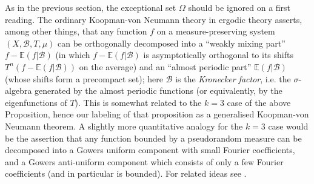 \documentclass[12pt,a4paper,reqno]{amsart}
\numberwithin{equation}{section}
\theoremstyle{plain}
\theoremstyle{definition}
\def\B{{\mathcal B}}
\def\E{{\mathbb E}}
\def\vs{\vspace{11pt}}
\def\ni{\noindent}
\def\emph#1{{\it #1}}
\begin{document}
\ni\emph{Remarks.}  As in the previous section, the exceptional set $\Omega$ should be ignored on a first reading. The ordinary Koopman-von Neumann theory in ergodic theory asserts, among other things, that any function $f$
on a measure-preserving system $(X,\B, T, \mu)$ can be orthogonally decomposed into a ``weakly mixing part'' $f-\E(f|\B)$ (in which $f-\E(f|\B)$
is asymptotically orthogonal to its shifts $T^n (f-\E(f|\B))$ on the average) and an ``almost periodic part'' $\E(f|\B)$ (whose shifts form a precompact
set); here $\B$ is the \emph{Kronecker factor}, i.e. the $\sigma$-algebra generated by the almost periodic functions (or equivalently, by the eigenfunctions of $T$).  
This is somewhat related to the $k=3$ case of the above Proposition, hence our labeling of that proposition as a generalised Koopman-von Neumann
theorem.  A slightly more quantitative analogy for the $k=3$ case would be the assertion that any function bounded by a pseudorandom measure can
be decomposed into a Gowers uniform component with small Fourier coefficients, and a Gowers anti-uniform component which consists of only a few Fourier coefficients
(and in particular is bounded). For related ideas see \cite{bourg2,green,green-tao}.\vs
\end{document}
